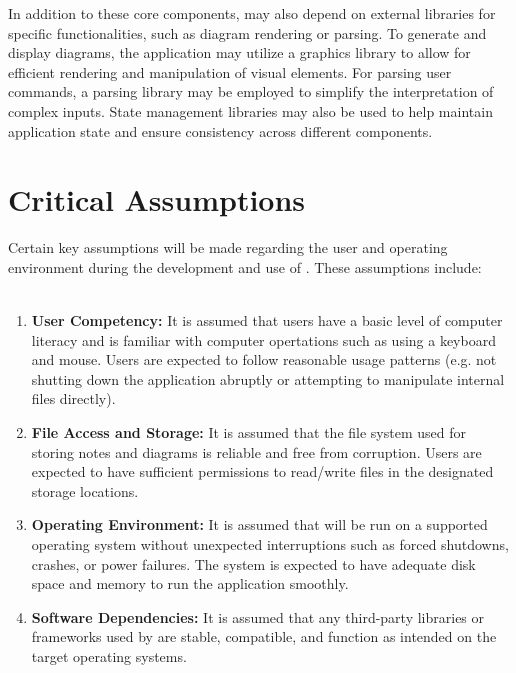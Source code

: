 \documentclass{article}
\begin{document}
In addition to these core components, \progname may also depend on external
libraries for specific functionalities, such as diagram rendering or parsing.
To generate and display diagrams, the application may utilize a graphics 
library to allow for efficient rendering and manipulation of visual elements.
For parsing user commands, a parsing library may be employed to simplify the
interpretation of complex inputs. State management libraries may also be used
to help maintain application state and ensure consistency across different
components.


\section{Critical Assumptions}

Certain key assumptions will be made regarding the user and operating environment
during the development and use of \progname. These assumptions include:
\\
\\
\begin{enumerate}
    \item \textbf{User Competency:} It is assumed that users have a basic level
    of computer literacy and is familiar with computer opertations such as using
    a keyboard and mouse. Users are expected to follow reasonable usage patterns
    (e.g. not shutting down the application abruptly or attempting to
    manipulate internal files directly).
    \item \textbf{File Access and Storage:} It is assumed that the file system
    used for storing notes and diagrams is reliable and free from corruption.
    Users are expected to have sufficient permissions to read/write files in
    the designated storage locations.
    \item \textbf{Operating Environment:} It is assumed that \progname will be
    run on a supported operating system without unexpected interruptions such
    as forced shutdowns, crashes, or power failures. The system is expected to
    have adequate disk space and memory to run the application smoothly.
    \item \textbf{Software Dependencies:} It is assumed that any third-party
    libraries or frameworks used by \progname are stable, compatible, and
    function as intended on the target operating systems. 
\end{enumerate}
\end{document}
